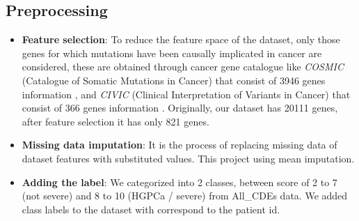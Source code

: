 \documentclass[a4paper,oneside]{article}
\begin{document}
\subsection{Preprocessing}
\begin{itemize}
\item \textbf{Feature selection}: To reduce the feature space of the dataset, only those genes for which mutations have been causally implicated in cancer are considered, these are obtained through cancer gene catalogue like \textit{COSMIC} (Catalogue of Somatic Mutations in Cancer) that consist of 3946 genes information \cite{cosmicdata}, and \textit{CIVIC} (Clinical Interpretation of Variants in Cancer) that consist of 366 genes information \cite{civicdata}. Originally, our dataset has 20111 genes, after feature selection it has only 821 genes.
\item \textbf{Missing data imputation}: It is the process of replacing missing data of dataset features with substituted values. This project using mean imputation.
\item \textbf{Adding the label}: We categorized into 2 classes, between score of 2 to 7 (not severe) and 8 to 10 (HGPCa / severe)  from All\_CDEs data. We added class labels to the dataset with correspond to the patient id.

\end{itemize}
\end{document}
